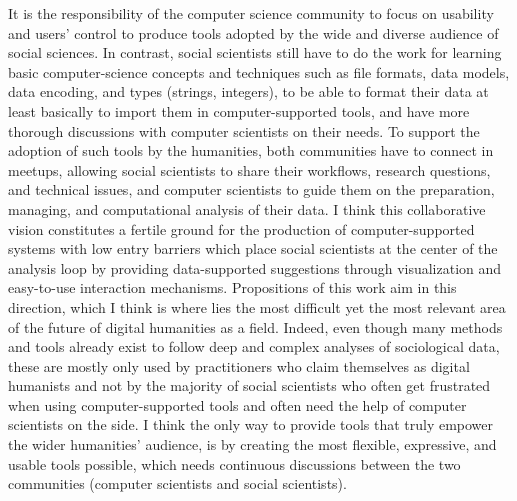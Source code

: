 It is the responsibility of the computer science community to focus on usability and users' control to produce tools adopted by the wide and diverse audience of social sciences.
In contrast, social scientists still have to do the work for learning basic computer-science concepts and techniques such as file formats, data models, data encoding, and types (strings, integers), to be able to format their data at least basically to import them in computer-supported tools, and have more thorough discussions with computer scientists on their needs.
To support the adoption of such tools by the humanities, both communities have to connect in meetups, allowing social scientists to share their workflows, research questions, and technical issues, and computer scientists to guide them on the preparation, managing, and computational analysis of their data.
I think this collaborative vision constitutes a fertile ground for the production of computer-supported systems with low entry barriers which place social scientists at the center of the analysis loop by providing data-supported suggestions through visualization and easy-to-use interaction mechanisms.
Propositions of this work aim in this direction, which I think is where lies the most difficult yet the most relevant area of the future of digital humanities as a field.
Indeed, even though many methods and tools already exist to follow deep and complex analyses of sociological data, these are mostly only used by practitioners who claim themselves as digital humanists and not by the majority of social scientists who often get frustrated when using computer-supported tools and often need the help of computer scientists on the side.
I think the only way to provide tools that truly empower the wider humanities' audience, is by creating the most flexible, expressive, and usable tools possible, which needs continuous discussions between the two communities (computer scientists and social scientists).



